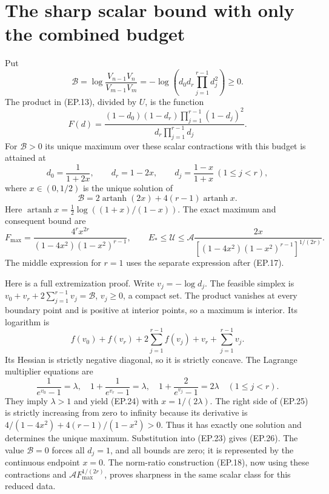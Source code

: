 \documentclass[11pt]{article}
\newcommand{\atanh}{\operatorname{artanh}}
\begin{document}
\section{The sharp scalar bound with only the combined budget}
Put
\[
 \mathcal B=\log\frac{V_{n-1}V_n}{V_{m-1}V_m}
 =-\log\left(d_0d_r\prod_{j=1}^{r-1}d_j^2\right)\ge0.
\tag{EP.22}
\]
The product in (EP.13), divided by $U$, is the function
\[
 F(d)=\frac{(1-d_0)(1-d_r)\prod_{j=1}^{r-1}(1-d_j)^2}
 {d_r\prod_{j=1}^{r-1}d_j}.
\tag{EP.23}
\]
For $\mathcal B>0$ its unique maximum over these scalar contractions
with this budget is attained at
\[
 d_0=\frac1{1+2x},\qquad d_r=1-2x,\qquad
 d_j=\frac{1-x}{1+x}\ (1\le j<r),\tag{EP.24}
\]
where $x\in(0,1/2)$ is the unique solution of
\[
 \mathcal B=2\atanh(2x)+4(r-1)\atanh x.
\tag{EP.25}
\]
Here $\atanh x=\tfrac12\log((1+x)/(1-x))$.
The exact maximum and consequent bound are
\[
 F_{\max}=\frac{4^r x^{2r}}{(1-4x^2)(1-x^2)^{r-1}},\qquad
 \boxed{E_*\le\mathcal U\le
 \mathcal A\frac{2x}{[(1-4x^2)(1-x^2)^{r-1}]^{1/(2r)}}.}
\tag{EP.26}
\]
The middle expression for $r=1$ uses the separate expression after
(EP.17).

Here is a full extremization proof. Write $v_j=-\log d_j$.
The feasible simplex is $v_0+v_r+2\sum_{j=1}^{r-1}v_j=\mathcal B$,
$v_j\ge0$, a compact set. The product vanishes at every boundary
point and is positive at interior points, so a maximum is interior.
Its logarithm is
\[
 f(v_0)+f(v_r)+2\sum_{j=1}^{r-1}f(v_j)
                 +v_r+\sum_{j=1}^{r-1}v_j.
\tag{EP.27}
\]
Its Hessian is strictly negative diagonal, so it is strictly concave.
The Lagrange multiplier equations are
\[
 \frac1{e^{v_0}-1}=\lambda,\quad
 1+\frac1{e^{v_r}-1}=\lambda,\quad
 1+\frac2{e^{v_j}-1}=2\lambda\quad(1\le j<r).
\tag{EP.28}
\]
They imply $\lambda>1$ and yield (EP.24) with $x=1/(2\lambda)$.
The right side of (EP.25) is strictly increasing from zero to
infinity because its derivative is
$4/(1-4x^2)+4(r-1)/(1-x^2)>0$.
Thus it has exactly one solution and determines the unique maximum.
Substitution into (EP.23) gives (EP.26). The value $\mathcal B=0$
forces all $d_j=1$, and all bounds are zero; it is represented by
the continuous endpoint $x=0$. The norm-ratio construction (EP.18),
now using these contractions and $\mathcal A F_{\max}^{1/(2r)}$,
proves sharpness in the same scalar class for this reduced data.
\end{document}
